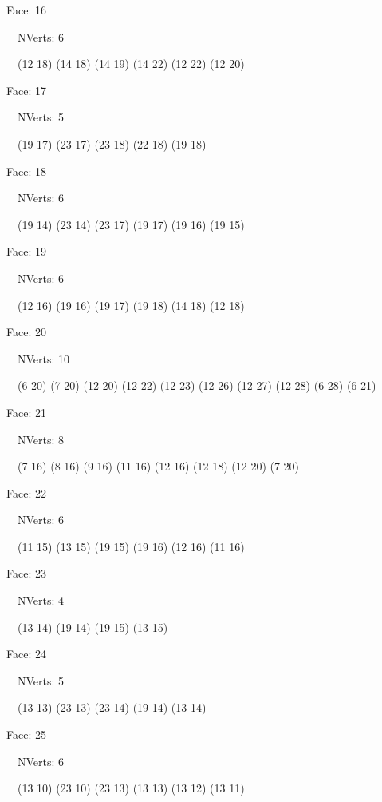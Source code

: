 \documentclass{article}
\begin{document}
{\footnotesize 

Face: 16

\   \    NVerts: 6

 \   \   (12 18) (14 18) (14 19) (14 22) (12 22) (12 20)}

{\footnotesize 

Face: 17

\   \    NVerts: 5

 \   \   (19 17) (23 17) (23 18) (22 18) (19 18)}

{\footnotesize 

Face: 18

\   \    NVerts: 6

 \   \   (19 14) (23 14) (23 17) (19 17) (19 16) (19 15)}

{\footnotesize 

Face: 19

\   \    NVerts: 6

 \   \   (12 16) (19 16) (19 17) (19 18) (14 18) (12 18)}

{\footnotesize 

Face: 20

\   \    NVerts: 10

 \   \   (6 20) (7 20) (12 20) (12 22) (12 23) (12 26) (12 27) (12 28) (6 28) (6 21)}

{\footnotesize 

Face: 21

\   \    NVerts: 8

 \   \   (7 16) (8 16) (9 16) (11 16) (12 16) (12 18) (12 20) (7 20)}

{\footnotesize 

Face: 22

\   \    NVerts: 6

 \   \   (11 15) (13 15) (19 15) (19 16) (12 16) (11 16)}

{\footnotesize 

Face: 23

\   \    NVerts: 4

 \   \   (13 14) (19 14) (19 15) (13 15)}

{\footnotesize 

Face: 24

\   \    NVerts: 5

 \   \   (13 13) (23 13) (23 14) (19 14) (13 14)}

{\footnotesize 

Face: 25

\   \    NVerts: 6

 \   \   (13 10) (23 10) (23 13) (13 13) (13 12) (13 11)}
\end{document}

